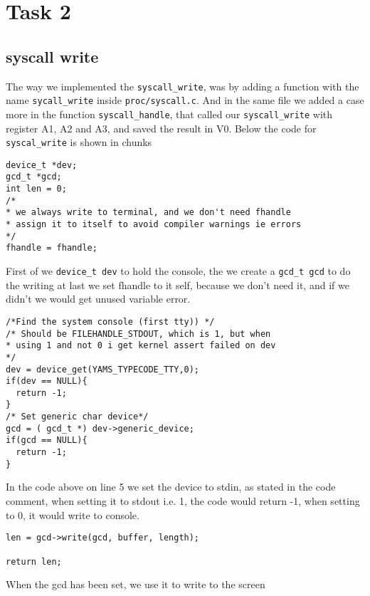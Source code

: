 \documentclass[11pt]{article}
\begin{document}
\section{Task 2}

\subsection{syscall write}
The way we implemented the \verb|syscall_write|, was by adding a function with the name \verb|sycall_write| inside \verb|proc/syscall.c|. And in the same file we added a case more in the function \verb|syscall_handle|, that called our \verb|syscall_write| with register A1, A2 and A3, and saved the result in V0. Below the code for \verb|syscal_write| is shown in chunks
\newline
\begin{lstlisting}
device_t *dev;
gcd_t *gcd;
int len = 0;
/*
* we always write to terminal, and we don't need fhandle
* assign it to itself to avoid compiler warnings ie errors
*/
fhandle = fhandle;
\end{lstlisting}
First of we \verb|device_t dev| to hold the console, the we create a \verb|gcd_t gcd| to do the writing at last we set fhandle to it self, because we don't need it, and if we didn't we would get unused variable error.
\newline
\begin{lstlisting}
/*Find the system console (first tty)) */
/* Should be FILEHANDLE_STDOUT, which is 1, but when
* using 1 and not 0 i get kernel assert failed on dev
*/
dev = device_get(YAMS_TYPECODE_TTY,0);
if(dev == NULL){
  return -1;
}
/* Set generic char device*/
gcd = ( gcd_t *) dev->generic_device;
if(gcd == NULL){
  return -1;
}
\end{lstlisting}
In the code above on line 5 we set the device to stdin, as stated in the code comment, when setting it to stdout i.e. 1, the code would return -1, when setting to 0, it would write to console.
\newline
\begin{lstlisting}
len = gcd->write(gcd, buffer, length);

return len;
\end{lstlisting}
When the gcd has been set, we use it to write to the screen
\end{document}
